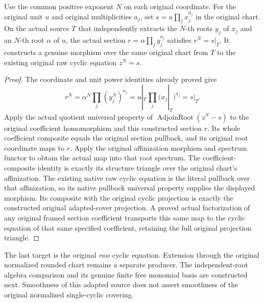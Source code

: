 \begin{lemma}
\label{lem:kn-nadel-kummer-original-cyclic-map}
\leanok
{}
Use the common positive exponent $N$ on each original coordinate.
For the original unit $u$ and original multiplicities $a_j$, set
$s=u\prod_jx_j^{a_j}$ in the original chart.  On the actual source
$T$ that independently extracts the $N$-th roots $y_j$ of $x_j$
and an $N$-th root $\alpha$ of $u$, the actual section
$r=\alpha\prod_jy_j^{a_j}$ satisfies $r^N=s|_T$.
It constructs a genuine morphism over the same original chart
from $T$ to the existing original raw cyclic equation $z^N=s$.
\end{lemma}
\begin{proof}
The coordinate and unit power identities already proved give
\[
 r^N=\alpha^N\prod_j(y_j^N)^{a_j}
     =u|_T\prod_j(x_j|_T)^{a_j}=s|_T.
\]
Apply the actual quotient universal property of
$\operatorname{AdjoinRoot}(z^N-s)$ to the original coefficient
homomorphism and this constructed section $r$.  Its whole
coefficient composite equals the original section pullback, and
its original root coordinate maps to $r$.  Apply the original
affinization morphism and spectrum functor to obtain the actual
map into that root spectrum.  The coefficient-composite identity
is exactly its structure triangle over the original chart's
affinization.  The existing native raw cyclic equation is the
literal pullback over that affinization, so its native pullback
universal property supplies the displayed morphism.  Its composite
with the original cyclic projection is exactly the constructed
original adapted-cover projection.  A proved actual factorization of
any original framed section coefficient transports this same map to
the cyclic equation of that same specified coefficient, retaining
the full original projection triangle.
\end{proof}

The last target is the original \emph{raw} cyclic equation.
Extension through the original normalized rounded chart remains a
separate producer.  The independent-root algebra comparison and
its genuine finite free monomial basis are constructed next.  Smoothness
of this adapted source does not assert smoothness of the original
normalized single-cyclic covering.

